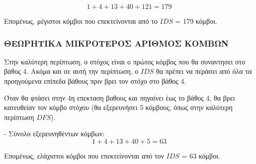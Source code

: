 \documentclass{article}
\begin{document}
\[
1 + 4 + 13 + 40 + 121 = 179
\]

Επομένως, μέγιστοι κόμβοι που επεκτείνονται από το \(IDS\) = 179 κόμβοι.

\subsubsection*{ΘΕΩΡΗΤΙΚΑ ΜΙΚΡΟΤΕΡΟΣ ΑΡΙΘΜΟΣ ΚΟΜΒΩΝ}
Στην καλύτερη περίπτωση, ο στόχος είναι ο πρώτος κόμβος που θα συναντησει στο βάθος 4. Ακόμα και σε αυτή την περίπτωση, ο \(IDS\) θα πρέπει να περάσει από όλα τα προηγούμενα επίπεδα βάθους πριν βρει τον στόχο στο βάθος 4.

Όταν θα φτάσει στην 4η επεκταση βαθους και πηγαίνει έως το βάθος 4, θα βρει κατευθείαν τον κόμβο στόχου (θα εξερευνήσει 5 κόμβους, όπως στην καλύτερη περίπτωση \(DFS\)).   
     
- Σύνολο εξερευνηθέντων κόμβων:
\[
1 + 4 + 13 + 40 + 5= 63
\]

Επομένως, ελάχιστοι κόμβοι που επεκτείνονται από τον \(IDS\) = 63 κόμβοι.
\end{document}
